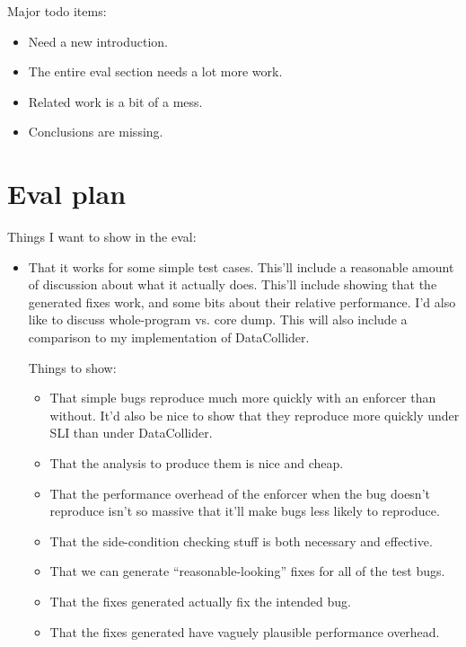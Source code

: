 Major todo items:

\begin{itemize}
\item Need a new introduction.
\item The entire eval section needs a lot more work.
\item Related work is a bit of a mess.
\item Conclusions are missing.
\end{itemize}


\section{Eval plan}

Things I want to show in the eval:

\begin{itemize}
\item That it works for some simple test cases.  This'll include a
  reasonable amount of discussion about what it actually does.
  This'll include showing that the generated fixes work, and some bits
  about their relative performance.  I'd also like to discuss
  whole-program vs. core dump.  This will also include a comparison to
  my implementation of DataCollider.

  Things to show:

  \begin{itemize}
  \item That simple bugs reproduce much more quickly with an enforcer
    than without.  It'd also be
    nice to show that they reproduce more quickly under SLI than under
    DataCollider.
  \item That the analysis to produce them is nice and cheap.
  \item That the performance overhead of the enforcer when the bug
    doesn't reproduce isn't so massive that it'll make bugs less
    likely to reproduce.
  \item That the side-condition checking stuff is both necessary and
    effective.
  \item That we can generate ``reasonable-looking'' fixes for all of
    the test bugs.
  \item That the fixes generated actually fix the intended bug.

  \item That the fixes generated have vaguely plausible performance
    overhead.
  \end{itemize}


\end{itemize}
